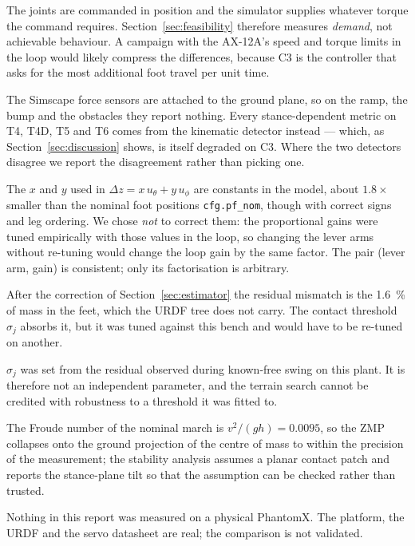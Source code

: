 \documentclass[11pt,a4paper]{article}
\newcommand{\Cth}{\textsf{C3}}
\begin{document}
\begin{description}[style=unboxed,leftmargin=0pt,font=\normalfont\itshape]

\item[Ideal actuators.] The joints are commanded in position and the simulator
supplies whatever torque the command requires. Section~\ref{sec:feasibility}
therefore measures \emph{demand}, not achievable behaviour. A campaign with
the AX-12A's speed and torque limits in the loop would likely compress the
differences, because \Cth{} is the controller that asks for the most
additional foot travel per unit time.

\item[The contact sensors see only the floor.] The Simscape force sensors are
attached to the ground plane, so on the ramp, the bump and the obstacles they
report nothing. Every stance-dependent metric on T4, T4D, T5 and T6 comes from
the kinematic detector instead --- which, as Section~\ref{sec:discussion}
shows, is itself degraded on \Cth. Where the two detectors disagree we report
the disagreement rather than picking one.

\item[The attitude lever arms are hardcoded.] The $x$ and $y$ used in
$\Delta z = x\,u_\theta + y\,u_\phi$ are constants in the model, about
$1.8\times$ smaller than the nominal foot positions \texttt{cfg.pf\_nom},
though with correct signs and leg ordering. We chose \emph{not} to correct
them: the proportional gains were tuned empirically with those values in the
loop, so changing the lever arms without re-tuning would change the loop gain
by the same factor. The pair (lever arm, gain) is consistent; only its
factorisation is arbitrary.

\item[The inverse-dynamics estimator is not the plant.] After the correction of
Section~\ref{sec:estimator} the residual mismatch is the \SI{1.6}{\percent}
of mass in the feet, which the URDF tree does not carry. The contact threshold
$\sigma_j$ absorbs it, but it was tuned against this bench and would have to be
re-tuned on another.

\item[The threshold is self-tuned.] $\sigma_j$ was set from the residual
observed during known-free swing on this plant. It is therefore not an
independent parameter, and the terrain search cannot be credited with
robustness to a threshold it was fitted to.

\item[Quasi-static stability only.] The Froude number of the nominal march is
$v^2/(gh) = 0.0095$, so the ZMP collapses onto the ground projection of the
centre of mass to within the precision of the measurement; the stability
analysis assumes a planar contact patch and reports the stance-plane tilt so
that the assumption can be checked rather than trusted.

\item[No hardware.] Nothing in this report was measured on a physical
PhantomX. The platform, the URDF and the servo datasheet are real; the
comparison is not validated.

\end{description}
\end{document}
